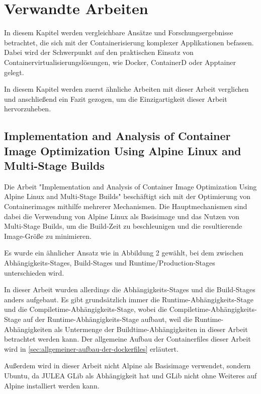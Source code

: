 \chapter{Verwandte Arbeiten} \label{cha:related-work}

In diesem Kapitel werden vergleichbare Ansätze und Forschungsergebnisse betrachtet, die sich mit der Containerisierung komplexer Applikationen befassen. Dabei wird der Schwerpunkt auf den praktischen Einsatz von Containervirtualisierungslösungen, wie Docker, ContainerD oder Apptainer gelegt.

In diesem Kapitel werden zuerst ähnliche Arbeiten mit dieser Arbeit verglichen und anschließend ein Fazit gezogen, um die Einzigartigkeit dieser Arbeit hervorzuheben.

\section{Implementation and Analysis of Container Image Optimization Using Alpine Linux and Multi-Stage Builds \cite{fachrudinImplementationAnalysisContainer2025}}

Die Arbeit "Implementation and Analysis of Container Image Optimization Using Alpine Linux and Multi-Stage Builds" beschäftigt sich mit der Optimierung von Containerimages mithilfe mehrerer Mechanismen. Die Hauptmechanismen sind dabei die Verwendung von Alpine Linux als Basisimage und das Nutzen von Multi-Stage Builds, um die Build-Zeit zu beschleunigen und die resultierende Image-Größe zu minimieren. 

Es wurde ein ähnlicher Ansatz wie in Abbildung 2 \cite[Vgl. S. 11]{fachrudinImplementationAnalysisContainer2025} gewählt, bei dem zwischen Abhängigkeits-Stages, Build-Stages und Runtime/Production-Stages unterschieden wird. 

In dieser Arbeit wurden allerdings die Abhängigkeits-Stages und die Build-Stages anders aufgebaut. Es gibt grundsätzlich immer die Runtime-Abhängigkeits-Stage und die Compiletime-Abhängigkeits-Stage, wobei die Compiletime-Abhängigkeits-Stage auf der Runtime-Abhängigkeits-Stage aufbaut, weil die Runtime-Abhängigkeiten als Untermenge der Buildtime-Abhängigkeiten in dieser Arbeit betrachtet werden kann. Der allgemeine Aufbau der Containerfiles dieser Arbeit wird in \cref{sec:allgemeiner-aufbau-der-dockerfiles} erläutert. 

Außerdem wird in dieser Arbeit nicht Alpine als Basisimage verwendet, sondern Ubuntu, da JULEA GLib als Abhängigkeit hat und GLib nicht ohne Weiteres auf Alpine installiert werden kann.

